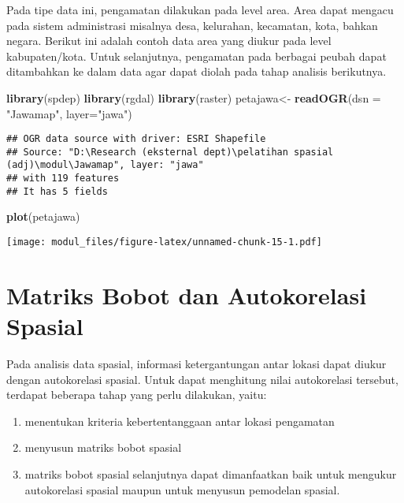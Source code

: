 \documentclass[
]{book}
\newenvironment{Shaded}{\begin{snugshade}}{\end{snugshade}}
\newcommand{\DataTypeTok}[1]{\textcolor[rgb]{0.13,0.29,0.53}{#1}}
\newcommand{\KeywordTok}[1]{\textcolor[rgb]{0.13,0.29,0.53}{\textbf{#1}}}
\newcommand{\NormalTok}[1]{#1}
\newcommand{\StringTok}[1]{\textcolor[rgb]{0.31,0.60,0.02}{#1}}
\begin{document}
Pada tipe data ini, pengamatan dilakukan pada level area. Area dapat mengacu pada sistem administrasi misalnya desa, kelurahan, kecamatan, kota, bahkan negara. Berikut ini adalah contoh data area yang diukur pada level kabupaten/kota. Untuk selanjutnya, pengamatan pada berbagai peubah dapat ditambahkan ke dalam data agar dapat diolah pada tahap analisis berikutnya.

\begin{Shaded}
\begin{Highlighting}[]
\KeywordTok{library}\NormalTok{(spdep)}
\KeywordTok{library}\NormalTok{(rgdal)}
\KeywordTok{library}\NormalTok{(raster)}
\NormalTok{petajawa\textless{}{-}}\StringTok{ }\KeywordTok{readOGR}\NormalTok{(}\DataTypeTok{dsn =} \StringTok{"Jawamap"}\NormalTok{, }\DataTypeTok{layer=}\StringTok{"jawa"}\NormalTok{)}
\end{Highlighting}
\end{Shaded}

\begin{verbatim}
## OGR data source with driver: ESRI Shapefile 
## Source: "D:\Research (eksternal dept)\pelatihan spasial (adj)\modul\Jawamap", layer: "jawa"
## with 119 features
## It has 5 fields
\end{verbatim}

\begin{Shaded}
\begin{Highlighting}[]
\KeywordTok{plot}\NormalTok{(petajawa)}
\end{Highlighting}
\end{Shaded}

\texttt{[image: modul\_files/figure-latex/unnamed-chunk-15-1.pdf]}

\hypertarget{matriks-bobot-dan-autokorelasi-spasial}{%
\section{Matriks Bobot dan Autokorelasi Spasial}\label{matriks-bobot-dan-autokorelasi-spasial}}

Pada analisis data spasial, informasi ketergantungan antar lokasi dapat diukur dengan autokorelasi spasial. Untuk dapat menghitung nilai autokorelasi tersebut, terdapat beberapa tahap yang perlu dilakukan, yaitu:

\begin{enumerate}
\def\labelenumi{(\arabic{enumi})}
\item
  menentukan kriteria kebertentanggaan antar lokasi pengamatan
\item
  menyusun matriks bobot spasial
\item
  matriks bobot spasial selanjutnya dapat dimanfaatkan baik untuk mengukur autokorelasi spasial maupun untuk menyusun pemodelan spasial.
\end{enumerate}
\end{document}
